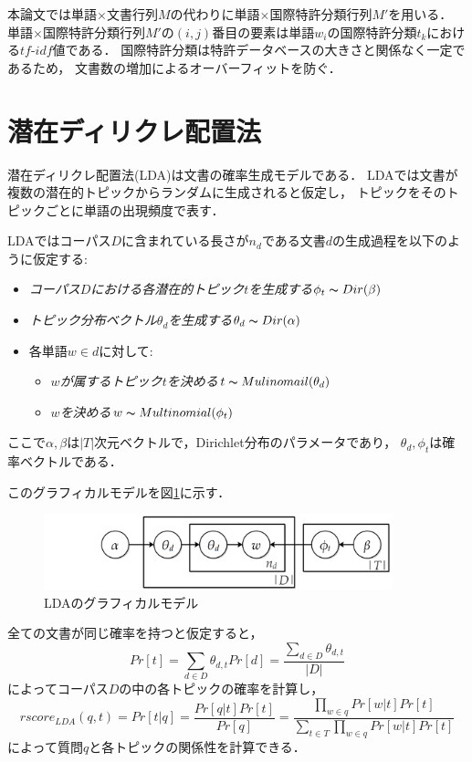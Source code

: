 \documentclass[master]{suribt}
\theoremstyle{definition}
\begin{document}
 本論文では単語$\times$文書行列$M$の代わりに単語$\times$国際特許分類行列$M'$を用いる．
 単語$\times$国際特許分類行列$M'$の$(i,j)$番目の要素は単語$w_i$の国際特許分類$t_k$における$tf\text{-}idf$値である．
 国際特許分類は特許データベースの大きさと関係なく一定であるため，
 文書数の増加によるオーバーフィットを防ぐ．

 \section{潜在ディリクレ配置法}\label{s:LDA}
 潜在ディリクレ配置法(LDA)は文書の確率生成モデルである．
 LDAでは文書が複数の潜在的トピックからランダムに生成されると仮定し，
 トピックをそのトピックごとに単語の出現頻度で表す．

 
 LDAではコーパス$D$に含まれている長さが$n_d$である文書$d$の生成過程を以下のように仮定する:
 \begin{itemize}
 \item {\em コーパス$D$における各潜在的トピック$t$を生成する}$\phi_{t} \thicksim Dir(\beta)$
 \item {\em トピック分布ベクトル$\theta_d$を生成する}$\theta_d \thicksim Dir(\alpha)$
 \item 各単語$w \in d$に対して:
  \begin{itemize}
   \item {\em $w$が属するトピック$t$を決める}$t \thicksim Mulinomail(\theta_d)$
   \item {\em $w$を決める}$w \thicksim Multinomial(\phi_{t})$
  \end{itemize}
 \end{itemize}
 
 ここで$\alpha,\beta$は$|T|$次元ベクトルで，Dirichlet分布のパラメータであり，
 $\theta_d,\phi_{t}$は確率ベクトルである．

 このグラフィカルモデルを図\ref{fig:LDA}に示す．
 \begin{figure}
 \includegraphics[width=0.9\textwidth,natwidth=557,natheight=141]{LDA.png}
 \caption{LDAのグラフィカルモデル}
 \label{fig:LDA}
 \end{figure}
 
 全ての文書が同じ確率を持つと仮定すると，
 \begin{equation}
 Pr[t] = \sum_{d \in D}\theta_{d,t}Pr[d] = \frac{\sum_{d \in D} \theta_{d,t}}{|D|}
 \end{equation}
 によってコーパス$D$の中の各トピックの確率を計算し，
 \begin{equation}
 rscore_{LDA}(q,t) = Pr[t|q] = \frac{Pr[q|t]Pr[t]}{Pr[q]} = \frac{\prod_{w \in q}Pr[w|t]Pr[t]}{\sum_{t \in T}\prod_{w \in q}Pr[w|t]Pr[t]}
 \end{equation}
 によって質問$q$と各トピックの関係性を計算できる．
\end{document}
